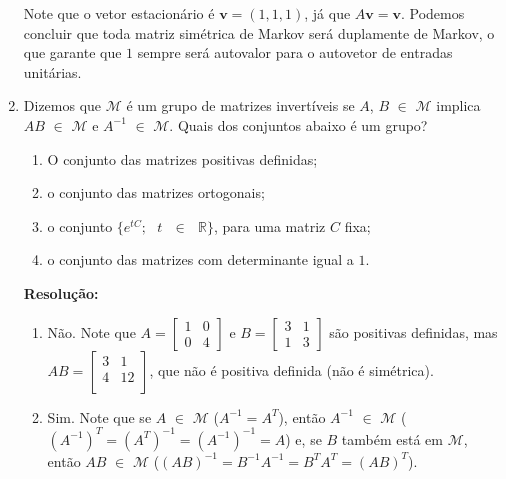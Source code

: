 \documentclass[leqno]{article}
\begin{document}
\begin{enumerate}
    Note que o vetor estacionário é $\textbf{v}=(1,1,1)$, já que $A\textbf{v}=\textbf{v}$. Podemos concluir que toda matriz simétrica de Markov será duplamente de Markov, o que garante que $1$ sempre será autovalor para o autovetor de entradas unitárias.
    
    \item Dizemos que $\mathcal{M}$ é um grupo de matrizes invertíveis se $A$, $B$ $\in$ $\mathcal{M}$ implica $AB$ $\in$ $\mathcal{M}$ e $A^{-1}$ $\in$ $\mathcal{M}$. Quais dos conjuntos abaixo é um grupo?
    
    \begin{enumerate}
        \item O conjunto das matrizes positivas definidas;
        
        \item o conjunto das matrizes ortogonais;
        
        \item o conjunto $\{e^{tC};\text{ }t\text{ }\in\text{ }\mathbb{R}\}$, para uma matriz $C$ fixa;
        
        \item o conjunto das matrizes com determinante igual a $1$.
    \end{enumerate}
    
    \textbf{Resolução:}
    
    \begin{enumerate}
        \item Não. Note que $A=\begin{bmatrix}
            1 & 0\\
            0 & 4
        \end{bmatrix}$ e $B=\begin{bmatrix}
            3 & 1\\
            1 & 3
        \end{bmatrix}$ são positivas definidas, mas $AB=\begin{bmatrix}
            3 & 1\\
            4 & 12\\
        \end{bmatrix}$, que não é positiva definida (não é simétrica).
        
        \item Sim. Note que se $A$ $\in$ $\mathcal{M}$ ($A^{-1}=A^T$), então $A^{-1}$ $\in$ $\mathcal{M}$ ($(A^{-1})^T=(A^{T})^{-1}=(A^{-1})^{-1}=A$) e, se $B$ também está em $\mathcal{M}$, então $AB$ $\in$ $\mathcal{M}$ ($(AB)^{-1}=B^{-1}A^{-1}=B^TA^T=(AB)^T$).
        

\end{enumerate}
\end{enumerate}
\end{document}
